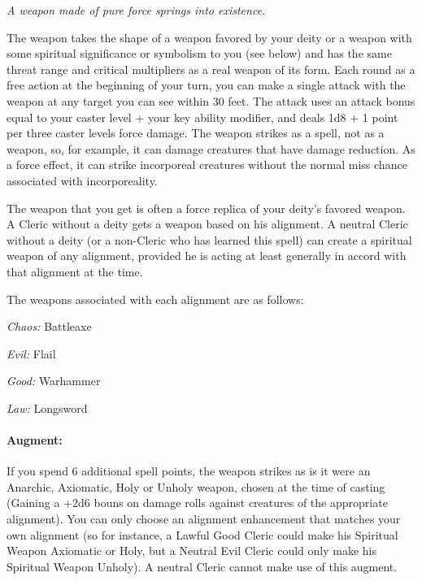 \emph{A weapon made of pure force springs into existence.}

The weapon takes the shape of a weapon favored by your deity or a weapon with some spiritual significance or symbolism to you (see below) 
and has the same threat range and critical multipliers as a real weapon of its form. 
Each round as a free action at the beginning of your turn, you can make a single attack with the weapon at any target you can see within 30 feet.
The attack uses an attack bonus equal to your caster level + your key ability modifier,
and deals 1d8 + 1 point per three caster levels force damage.
The weapon strikes as a spell, not as a weapon, so, for example, it can damage creatures that have damage reduction.
As a force effect, it can strike incorporeal creatures without the normal miss chance associated with incorporeality.

The weapon that you get is often a force replica of your deity's favored weapon. 
A Cleric without a deity gets a weapon based on his alignment. 
A neutral Cleric without a deity (or a non-Cleric who has learned this spell) can create a spiritual weapon of any alignment, 
provided he is acting at least generally in accord with that alignment at the time. 

The weapons associated with each alignment are as follows: 
\begin{list}{}{\leftmargin=1em}
 \item \emph{Chaos:} Battleaxe
 \item \emph{Evil:} Flail
 \item \emph{Good:} Warhammer
 \item \emph{Law:} Longsword
\end{list}

\paragraph{Augment:} If you spend 6 additional spell points, the weapon strikes as is it were an Anarchic, Axiomatic, Holy or Unholy weapon, chosen at the time of casting
(Gaining a +2d6 bouns on damage rolls against creatures of the appropriate alignment).
You can only choose an alignment enhancement that matches your own alignment (so for instance, a Lawful Good Cleric could make his Spiritual Weapon Axiomatic or Holy,
but a Neutral Evil Cleric could only make his Spiritual Weapon Unholy).
A neutral Cleric cannot make use of this augment.
